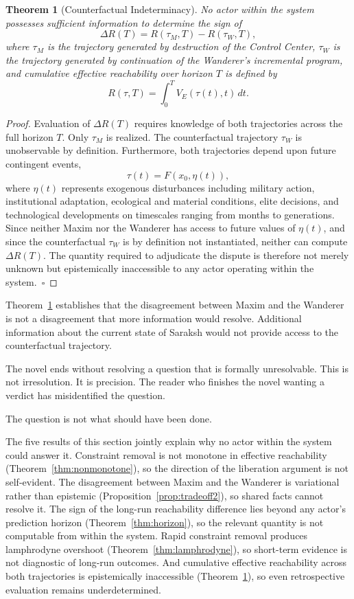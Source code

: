 \documentclass[12pt, a4paper]{article}
\theoremstyle{plain}
\newtheorem{theorem}{Theorem}[section]
\theoremstyle{definition}
\theoremstyle{remark}
\begin{document}
\begin{theorem}[Counterfactual Indeterminacy]
\label{thm:indeterminacy}
No actor within the system possesses sufficient
information to determine the sign of
\[
\Delta R(T) = R(\tau_M, T) - R(\tau_W, T),
\]
where $\tau_M$ is the trajectory generated by
destruction of the Control Center, $\tau_W$ is
the trajectory generated by continuation of the
Wanderer's incremental program, and cumulative
effective reachability over horizon $T$ is defined
by
\[
R(\tau, T) = \int_0^T V_E(\tau(t), t)\, dt.
\]
\end{theorem}

\begin{proof}
Evaluation of $\Delta R(T)$ requires knowledge
of both trajectories across the full horizon $T$.
Only $\tau_M$ is realized. The counterfactual
trajectory $\tau_W$ is unobservable by definition.
Furthermore, both trajectories depend upon future
contingent events,
\[
\tau(t) = F(x_0, \eta(t)),
\]
where $\eta(t)$ represents exogenous disturbances
including military action, institutional adaptation,
ecological and material conditions, elite decisions,
and technological developments on timescales
ranging from months to generations. Since neither
Maxim nor the Wanderer has access to future values
of $\eta(t)$, and since the counterfactual $\tau_W$
is by definition not instantiated, neither can
compute $\Delta R(T)$. The quantity required to
adjudicate the dispute is therefore not merely
unknown but epistemically inaccessible to any
actor operating within the system.~$\square$
\end{proof}

Theorem~\ref{thm:indeterminacy} establishes that
the disagreement between Maxim and the Wanderer
is not a disagreement that more information would
resolve. Additional information about the current
state of Saraksh would not provide access to the
counterfactual trajectory.

The novel ends without resolving a question that
is formally unresolvable. This is not irresolution.
It is precision. The reader who finishes the novel
wanting a verdict has misidentified the question.

The question is not what should have been done.

The five results of this section jointly explain
why no actor within the system could answer it.
Constraint removal is not monotone in effective
reachability (Theorem~\ref{thm:nonmonotone}),
so the direction of the liberation argument is
not self-evident. The disagreement between Maxim
and the Wanderer is variational rather than
epistemic (Proposition~\ref{prop:tradeoff2}),
so shared facts cannot resolve it. The sign of
the long-run reachability difference lies beyond
any actor's prediction horizon
(Theorem~\ref{thm:horizon}), so the relevant
quantity is not computable from within the system.
Rapid constraint removal produces lamphrodyne
overshoot (Theorem~\ref{thm:lamphrodyne}), so
short-term evidence is not diagnostic of
long-run outcomes. And cumulative effective
reachability across both trajectories is
epistemically inaccessible
(Theorem~\ref{thm:indeterminacy}), so even
retrospective evaluation remains underdetermined.
\end{document}
